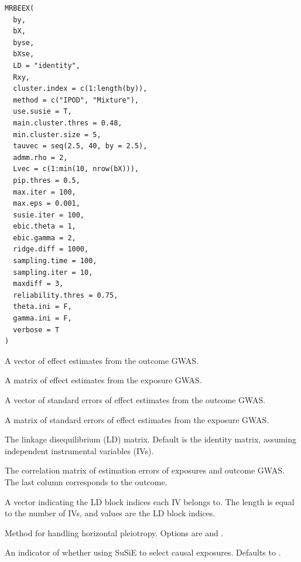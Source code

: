 \documentclass[a4paper]{book}
\begin{document}
%
\begin{Usage}
\begin{verbatim}
MRBEEX(
  by,
  bX,
  byse,
  bXse,
  LD = "identity",
  Rxy,
  cluster.index = c(1:length(by)),
  method = c("IPOD", "Mixture"),
  use.susie = T,
  main.cluster.thres = 0.48,
  min.cluster.size = 5,
  tauvec = seq(2.5, 40, by = 2.5),
  admm.rho = 2,
  Lvec = c(1:min(10, nrow(bX))),
  pip.thres = 0.5,
  max.iter = 100,
  max.eps = 0.001,
  susie.iter = 100,
  ebic.theta = 1,
  ebic.gamma = 2,
  ridge.diff = 1000,
  sampling.time = 100,
  sampling.iter = 10,
  maxdiff = 3,
  reliability.thres = 0.75,
  theta.ini = F,
  gamma.ini = F,
  verbose = T
)
\end{verbatim}
\end{Usage}
%
\begin{Arguments}
\begin{ldescription}
\item[\code{by}] A vector of effect estimates from the outcome GWAS.

\item[\code{bX}] A matrix of effect estimates from the exposure GWAS.

\item[\code{byse}] A vector of standard errors of effect estimates from the outcome GWAS.

\item[\code{bXse}] A matrix of standard errors of effect estimates from the exposure GWAS.

\item[\code{LD}] The linkage disequilibrium (LD) matrix. Default is the identity matrix, assuming independent instrumental variables (IVs).

\item[\code{Rxy}] The correlation matrix of estimation errors of exposures and outcome GWAS. The last column corresponds to the outcome.

\item[\code{cluster.index}] A vector indicating the LD block indices each IV belongs to. The length is equal to the number of IVs, and values are the LD block indices.

\item[\code{method}] Method for handling horizontal pleiotropy. Options are  and .

\item[\code{use.susie}] An indicator of whether using SuSiE to select causal exposures. Defaults to .


\end{ldescription}
\end{Arguments}
\end{document}
